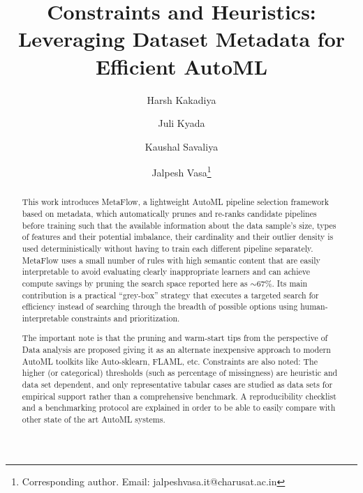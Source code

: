 \documentclass[runningheads]{llncs}
\begin{document}
\title{Constraints and Heuristics: Leveraging Dataset Metadata for Efficient AutoML}

\author{Harsh Kakadiya \and
        Juli Kyada    \and
        Kaushal Savaliya \and
        Jalpesh Vasa\thanks{Corresponding author. Email: jalpeshvasa.it@charusat.ac.in}}


\maketitle

\begin{abstract}
This work introduces MetaFlow, a lightweight AutoML pipeline selection framework based on metadata, which automatically prunes and re-ranks candidate pipelines before training such that the available information about the data sample's size, types of features and their potential imbalance, their cardinality and their outlier density is used deterministically without having to train each different pipeline separately. MetaFlow uses a small number of rules with high semantic content that are easily interpretable to avoid evaluating clearly inappropriate learners and can achieve compute savings by pruning the search space reported here as $\sim$67\%. Its main contribution is a practical ``grey-box'' strategy that executes a targeted search for efficiency instead of searching through the breadth of possible options using human-interpretable constraints and prioritization.

The important note is that the pruning and warm-start tips from the perspective of Data analysis are proposed giving it as an alternate inexpensive approach to modern AutoML toolkits like Auto-sklearn, FLAML, etc. Constraints are also noted: The higher (or categorical) thresholds (such as percentage of missingness) are heuristic and data set dependent, and only representative tabular cases are studied as data sets for empirical support rather than a comprehensive benchmark. A reproducibility checklist and a benchmarking protocol are explained in order to be able to easily compare with other state of the art AutoML systems.

\end{abstract}
\end{document}

